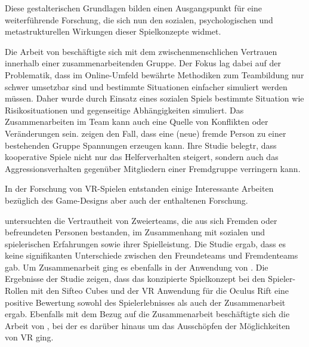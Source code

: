Diese gestalterischen Grundlagen bilden einen Ausgangspunkt für eine weiterführende Forschung, die sich nun den sozialen, psychologischen und metastrukturellen Wirkungen dieser Spielkonzepte widmet.

Die Arbeit von \cite{depping_trust_2016} beschäftigte sich mit dem zwischenmenschlichen Vertrauen innerhalb einer zusammenarbeitenden Gruppe. Der Fokus lag dabei auf der Problematik, dass im Online-Umfeld bewährte Methodiken zum Teambildung nur schwer umsetzbar sind und bestimmte Situationen einfacher simuliert werden müssen. Daher wurde durch Einsatz eines sozialen Spiels bestimmte Situation wie Risikosituationen und gegenseitige Abhängigkeiten simuliert. Das Zusammenarbeiten im Team kann auch eine Quelle von Konflikten oder Veränderungen sein. \cite{velez_ingroup_2014} zeigen den Fall, dass eine (neue) fremde Person zu einer bestehenden Gruppe Spannungen erzeugen kann. Ihre Studie belegtr, dass kooperative Spiele nicht nur das Helferverhalten steigert, sondern auch das Aggressionsverhalten gegenüber Mitgliedern einer Fremdgruppe verringern kann.

In der Forschung von \ac{VR}-Spielen entstanden einige Interessante Arbeiten bezüglich des Game-Designs aber auch der enthaltenen Forschung.

\cite{karaosmanoglu_playing_2023} untersuchten die Vertrautheit von Zweierteams, die aus sich Fremden oder befreundeten Personen bestanden, im Zusammenhang mit sozialen und spielerischen Erfahrungen sowie ihrer Spielleistung. Die Studie ergab, dass es keine signifikanten Unterschiede zwischen den Freundeteams und Fremdenteams gab. Um Zusammenarbeit ging es ebenfalls in der Anwendung von \cite{sajjadi_maze_2014}. Die Ergebnisse der Studie zeigen, dass das konzipierte Spielkonzept bei den Spieler-Rollen mit den Sifteo Cubes und der VR Anwendung für die Oculus Rift eine positive Bewertung sowohl des Spielerlebnisses als auch der Zusammenarbeit ergab. Ebenfalls mit dem Bezug auf die Zusammenarbeit beschäftigte sich die Arbeit von \cite{smilovitch_birdquestvr_2019}, bei der es darüber hinaus um das Ausschöpfen der Möglichkeiten von \ac{VR} ging.

